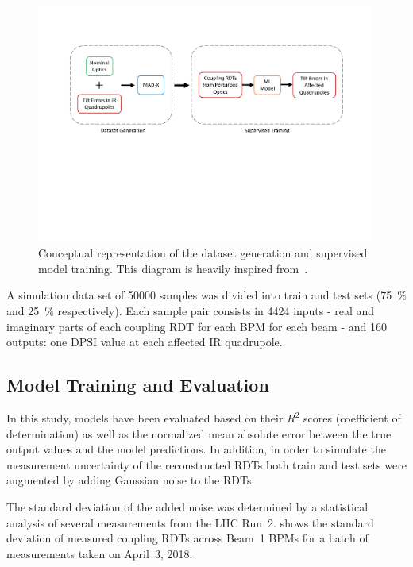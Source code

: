 \begin{figure}[!htb]
    \centering
    \includegraphics*[width=0.99\textwidth]{Figures/ML_for_IR_Coupling/supervised_training_schematic.pdf}
    \caption{Conceptual representation of the dataset generation and supervised model training. This diagram is heavily inspired from~\cite{PHD:Fol:Application_ML_Beam_Optics}.}
    \label{figure:ml_supervised_training_schematic}
\end{figure}

A simulation data set of \num{50000} samples was divided into train and test sets (\qty{75}{\percent} and \qty{25}{\percent} respectively).
Each sample pair consists in \num{4424} inputs - real and imaginary parts of each coupling RDT for each BPM for each beam - and \num{160} outputs: one \(\mathrm{DPSI}\) value at each affected IR quadrupole.

\subsection{Model Training and Evaluation}

In this study, models have been evaluated based on their \(R^2\) scores (coefficient of determination) as well as the normalized mean absolute error between the true output values and the model predictions.
In addition, in order to simulate the measurement uncertainty of the reconstructed RDTs both train and test sets were augmented by adding Gaussian noise to the RDTs.

The standard deviation of the added noise was determined by a statistical analysis of several measurements from the LHC Run~\num{2}.
 shows the standard deviation of measured coupling RDTs across Beam~\num{1} BPMs for a batch of measurements taken on April~\num{3}, \num{2018}.

